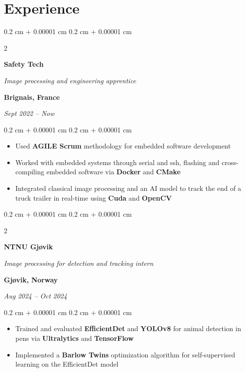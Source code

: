 \documentclass[10pt, letterpaper]{article}
\newenvironment{highlights}{
    \begin{itemize}[
        topsep=0.10 cm,
        parsep=0.10 cm,
        partopsep=0pt,
        itemsep=0pt,
        leftmargin=0.4 cm + 10pt
    ]
}{
    \end{itemize}
} %
\newenvironment{onecolentry}{
    \begin{adjustwidth}{
        0.2 cm + 0.00001 cm
    }{
        0.2 cm + 0.00001 cm
    }
}{
    \end{adjustwidth}
} %
\newenvironment{twocolentry}[2][]{
    \onecolentry
    \def\secondColumn{#2}
    \setcolumnwidth{\fill, 6 cm}
    \begin{paracol}{2}
}{
    \switchcolumn \raggedleft \secondColumn
    \end{paracol}
    \endonecolentry
} %
\begin{document}

    \section{Experience}
        \begin{twocolentry}{
			\textbf{Brignais, France}

			\textit{Sept 2022 – Now}}
            \textbf{Safety Tech}

            \textit{Image processing and engineering apprentice}
        \end{twocolentry}

        \vspace{0.2 cm}
        \begin{onecolentry}
            \begin{highlights}
                \item Used \textbf{AGILE Scrum} methodology for embedded software development
				\item Worked with embedded systems through serial and ssh, flashing and cross-compiling embedded software via \textbf{Docker} and \textbf{CMake}
				\item Integrated classical image processing and an AI model to track the end of a truck trailer in real-time using \textbf{Cuda} and \textbf{OpenCV}
            \end{highlights}
        \end{onecolentry}

		\vspace{0.8 cm}
        \begin{twocolentry}{
			\textbf{Gjøvik, Norway}

			\textit{Aug 2024 – Oct 2024}}
			\textbf{NTNU Gjøvik}

			\textit{Image processing for detection and tracking intern}
        \end{twocolentry}

        \vspace{0.2 cm}
        \begin{onecolentry}
            \begin{highlights}
                \item Trained and evaluated \textbf{EfficientDet} and \textbf{YOLOv8} for animal detection in pens via \textbf{Ultralytics} and \textbf{TensorFlow}
                \item Implemented a \textbf{Barlow Twins} optimization algorithm for self-supervised learning on the EfficientDet model
            \end{highlights}
        \end{onecolentry}
\end{document}

